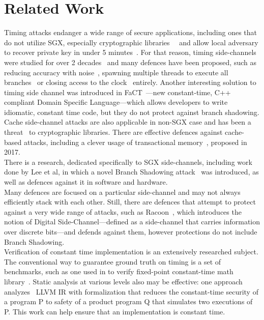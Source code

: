 \documentclass[sigplan, review]{acmart}
\begin{document}
\section{Related Work}
Timing attacks endanger a wide range of secure applications, including ones that do not utilize SGX, especially cryptographic libraries~\cite{arnaud2013timing}~\cite{garcia2016constant} and allow local adversary to recover private key in under 5 minutes~\cite{schwarz2017malware}. For that reason, timing side-channels were studied for over 2 decades~\cite{kocher1996timing} and many defences have been proposed, such as reducing accuracy with noise~\cite{hu1992reducing}, spawning multiple threads to execute all branches~\cite{devriese2010noninterference} or closing access to the clock~\cite{percival2005cache} entirely. Another interesting solution to timing side channel was introduced in FaCT~\cite{cauligi2017fact}---new constant-time, C++ compliant Domain Specific Language---which allows developers to write idiomatic, constant time code, but they do not protect against branch shadowing.\\
Cache side-channel attacks are also applicable in non-SGX case and has been a threat~\cite{osvik2006cache} to cryptographic libraries. There are effective defences against cache-based attacks, including a clever usage of transactional memory~\cite{gruss2017strong}, proposed in 2017.\\
There is a research, dedicated specifically to SGX side-channels, including work done by Lee et al, in which a novel Branch Shadowing attack~\cite{lee2016inferring} was introduced, as well as defences against it in software and hardware.\\
Many defences are focused on a particular side-channel and may not always efficiently stack with each other. Still, there are defences that attempt to protect against a very wide range of attacks, such as Racoon~\cite{rane2015raccoon}, which introduces the notion of Digital Side-Channel---defined as a side-channel that carries information over discrete bits---and defends against them, however protections do not include Branch Shadowing.\\
Verification of constant time implementation is an extensively researched subject. The conventional way to guarantee ground truth on timing is a set of benchmarks, such as one used in to verify fixed-point constant-time math library~\cite{andrysco2015subnormal}. Static analysis at various levels also may be effective: one approach analyzes~\cite{almeida2016verifying} LLVM IR with formalization that reduces the constant-time security of a program P to safety of a product program Q that simulates two executions of P. This work can help ensure that an implementation is constant time.
\end{document}
